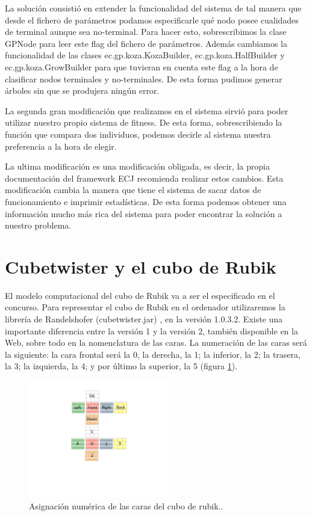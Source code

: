 La solución consistió en extender la funcionalidad del sistema de tal manera que
desde el fichero de parámetros podamos especificarle qué nodo posee cualidades de
terminal aunque sea no-terminal. Para hacer esto, sobrescribimos la clase GPNode
para leer este flag del fichero de parámetros. Además cambiamos la funcionalidad
de las clases ec.gp.koza.KozaBuilder, ec.gp.koza.HalfBuilder y
ec.gp.koza.GrowBuilder para que tuvieran en cuenta este flag a la hora de
clasificar nodos terminales y no-terminales. De esta forma pudimos generar
árboles sin que se produjera ningún error.

La segunda gran modificación que realizamos en el sistema sirvió para poder
utilizar nuestro propio sistema de fitness. De esta forma, sobrescribiendo la
función que compara dos individuos, podemos decirle al sistema nuestra
preferencia a la hora de elegir.

La ultima modificación es una modificación obligada, es decir, la propia
documentación del framework ECJ recomienda realizar estos cambios. Esta
modificación cambia la manera que tiene el sistema de sacar datos de
funcionamiento e imprimir estadísticas. De esta forma podemos obtener una
información mucho más rica del sistema para poder encontrar la solución a nuestro
problema.

\section{Cubetwister y el cubo de Rubik}\label{sec:cubetwister}


El modelo computacional del cubo de Rubik va a ser el especificado en el concurso. 
Para representar el cubo de Rubik en el ordenador utilizaremos la librería de
Randelshofer (cubetwister.jar) \cite{Randelshofer}, en la versión 1.0.3.2.
Existe una importante diferencia entre la versión 1 y la versión 2, también disponible en la Web,
sobre todo en la nomenclatura de las caras. La numeración de las caras será la
siguiente: la cara frontal será la 0, la derecha, la 1; la inferior, la 2; la
trasera, la 3; la izquierda, la 4; y por último la superior, la 5
(figura \ref{fig:carasrubik}).
 
\begin{figure}[t]
\centering
\includegraphics[width=0.55\textwidth]{figs/pdf/carasrubik}
\caption{Asignación numérica de las caras
del cubo de rubik..}
\label{fig:carasrubik}
\end{figure}

